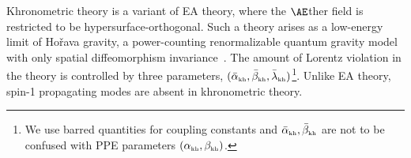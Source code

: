 \documentclass[prd,twocolumn,nofootinbib]{revtex4-1}
\newcommand{\KG}{{\mbox{\tiny kh}}}
\begin{document}
 
 
Khronometric theory is a variant of EA theory, where the $\AE$ther field is restricted to be hypersurface-orthogonal. Such a theory arises as a low-energy limit of Ho\v{r}ava gravity, a power-counting renormalizable quantum gravity model with only spatial diffeomorphism invariance~\cite{Blas:2009qj,Berti:2015itd,Horava:2009uw,Nishioka:2009iq,Visser:2009fg}. The amount of Lorentz violation in the theory is controlled by three parameters, $(\bar \alpha_{\KG}, \bar \beta_{\KG}, \bar \lambda_{\KG})$\footnote{We use barred quantities for coupling constants and $\bar \alpha_{\KG}, \bar \beta_{\KG}$ are not to be confused with PPE parameters $(\alpha_{\KG}, \beta_{\KG})$.}. Unlike EA theory, spin-1 propagating modes are absent in khronometric theory.

\end{document}
